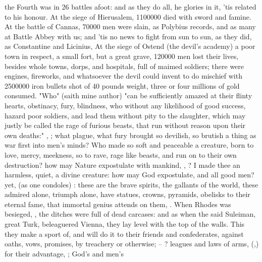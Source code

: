 the Fourth was in 26 battles afoot: and as they do all, he glories in it, 'tis
related to his honour. At the siege of Hierusalem,
1\thinspace{}100\thinspace{}000 died with sword and famine. At the battle of
Cannas, 70\thinspace{}000 men were slain, as Polybius
records, and as many at Battle Abbey with us; and 'tis no news to fight from
sun to sun, as they did, as Constantine and Licinius, \etc{} At the siege of
Ostend (the devil's academy) a poor town in respect, a small fort, but a great
grave, 120\thinspace{}000 men lost their lives, besides whole towns, dorps, and
hospitals, full of maimed soldiers; there were engines, fireworks, and
whatsoever the devil could invent to do mischief with
2\thinspace{}500\thinspace{}000 iron bullets shot of 40 pounds weight, three or
four millions of gold consumed. "Who" (saith mine author)
"can be sufficiently amazed at their flinty hearts, obstinacy, fury, blindness,
who without any likelihood of good success, hazard poor soldiers, and lead them
without pity to the slaughter, which may justly be called the rage of furious
beasts, that run without reason upon their own deaths:"
, \etc{};
what plague, what fury brought so devilish, so brutish a thing as war first
into men's minds? Who made so soft and peaceable a creature, born to love,
mercy, meekness, so to rave, rage like beasts, and run on to their own
destruction? how may Nature expostulate with mankind, , \etc{}? I made thee an harmless, quiet, a divine creature: how may God
expostulate, and all good men? yet,  (as
one condoles) : these are the brave spirits, the gallants of the world, these admired
alone, triumph alone, have statues, crowns, pyramids, obelisks to their eternal
fame, that immortal genius attends on them, . When Rhodes
was besieged, ,
the ditches were full of dead carcases: and as when the said Suleiman, great
Turk, beleaguered Vienna, they lay level with the top of the walls. This they
make a sport of, and will do it to their friends and confederates, against
oaths, vows, promises, by treachery or otherwise; --
? leagues and laws of arms,
(,) for their advantage,
; God's and men's
